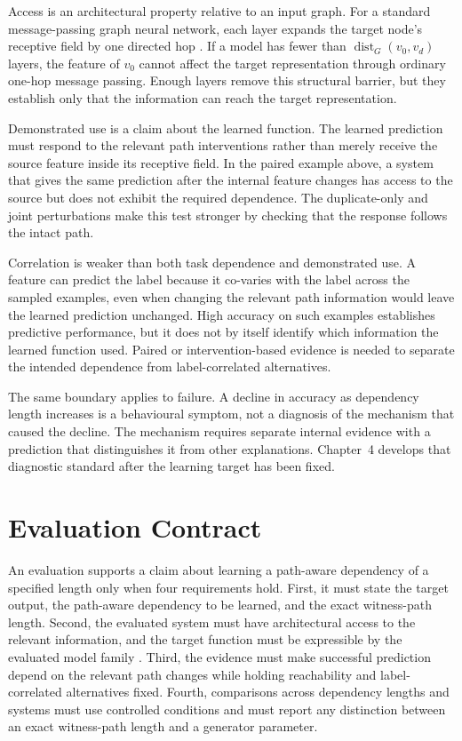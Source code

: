 Access is an architectural property relative to an input graph.
For a standard message-passing graph neural network, each layer expands the target node's receptive field by one directed hop \cite{scarselli2008graph,kipf2017semi}.
If a model has fewer than \(\operatorname{dist}_G(v_0,v_d)\) layers, the feature of \(v_0\) cannot affect the target representation through ordinary one-hop message passing.
Enough layers remove this structural barrier, but they establish only that the information can reach the target representation.

Demonstrated use is a claim about the learned function.
The learned prediction must respond to the relevant path interventions rather than merely receive the source feature inside its receptive field.
In the paired example above, a system that gives the same prediction after the internal feature changes has access to the source but does not exhibit the required dependence.
The duplicate-only and joint perturbations make this test stronger by checking that the response follows the intact path.

Correlation is weaker than both task dependence and demonstrated use.
A feature can predict the label because it co-varies with the label across the sampled examples, even when changing the relevant path information would leave the learned prediction unchanged.
High accuracy on such examples establishes predictive performance, but it does not by itself identify which information the learned function used.
Paired or intervention-based evidence is needed to separate the intended dependence from label-correlated alternatives.

The same boundary applies to failure.
A decline in accuracy as dependency length increases is a behavioural symptom, not a diagnosis of the mechanism that caused the decline.
The mechanism requires separate internal evidence with a prediction that distinguishes it from other explanations.
Chapter~4 develops that diagnostic standard after the learning target has been fixed.

\section{Evaluation Contract}

An evaluation supports a claim about learning a path-aware dependency of a specified length only when four requirements hold.
First, it must state the target output, the path-aware dependency to be learned, and the exact witness-path length.
Second, the evaluated system must have architectural access to the relevant information, and the target function must be expressible by the evaluated model family \cite{barcelo2020logical,zhou2025glora}.
Third, the evidence must make successful prediction depend on the relevant path changes while holding reachability and label-correlated alternatives fixed.
Fourth, comparisons across dependency lengths and systems must use controlled conditions and must report any distinction between an exact witness-path length and a generator parameter.

